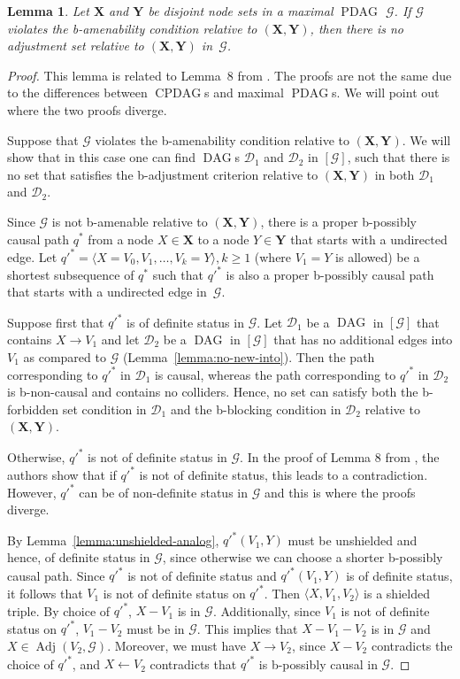 \documentclass[letterpaper]{article}
\newtheorem{lemma}[theorem]{Lemma}
\theoremstyle{definition}
\theoremstyle{remark}
\DeclareMathOperator{\PDAG}{PDAG}
\DeclareMathOperator{\CPDAG}{CPDAG}
\DeclareMathOperator{\DAG}{DAG}
\DeclareMathOperator{\Adj}{Adj}
\newcommand{\bamen}{the b-amenability condition}
\newcommand{\bforb}{the b-forbidden set condition}
\newcommand{\bblck}{the b-blocking condition}
\newcommand{\mpdag}{maximal $\PDAG$}
\newcommand{\g}[1][G]{\mathcal{#1}}
\newcommand{\pstar}[1][p]{{#1}^{*}}
\begin{document}
\begin{lemma}
Let $\mathbf{X}$ and $\mathbf{Y}$ be disjoint node sets in a \mpdag{} $\g$. If $\g$ violates \bamen{} relative to $(\mathbf{X},\mathbf{Y})$, then there is no adjustment set relative to $(\mathbf{X},\mathbf{Y})$ in~$\g$. 
\label{lemma:amen-pdag}
\end{lemma}

\begin{proof} 
This lemma is related to Lemma~8 from \cite{perkovic16}. The proofs are not the same due to the differences between $\CPDAG$s and \mpdag{}s. We will point out where the two proofs diverge.

   Suppose that $\g$ violates \bamen{} relative to $(\mathbf{X},\mathbf{Y})$. We will show that in this case one can find $\DAG$s $\g[D]_1$ and $\g[D]_2$ in $[\g]$, such that there is no set that satisfies the b-adjustment criterion relative to $(\mathbf{X,Y})$ in both $\g[D]_1$ and $\g[D]_2$.
 
 Since $\g$ is not b-amenable relative to $(\mathbf{X,Y})$, there is a proper b-possibly causal path $\pstar[q]$ from a node $X \in \mathbf{X}$ to a node $Y \in \mathbf{Y}$ that starts with a undirected edge.
   Let $\pstar[q'] = \langle X= V_0,V_1,\dots,V_k=Y\rangle, k \ge 1$ (where $V_1 = Y$ is allowed) be a shortest subsequence of $\pstar[q]$ such that $\pstar[q']$ is also a proper b-possibly causal path that starts with a undirected edge in~$\g$. 
  
   Suppose first that $\pstar[q']$ is of definite status in $\g$. Let $\g[D]_1$ be a $\DAG$ in $[\g]$ that contains $X \rightarrow V_1$  and let $\g[D]_2$ be a $\DAG$ in $[\g]$ that has no additional edges into $V_1$ as compared to $\g$ (Lemma~\ref{lemma:no-new-into}). Then the path corresponding to $\pstar[q']$ in $\g[D]_1$ is causal, whereas the path corresponding to $\pstar[q']$ in $\g[D]_2$ is b-non-causal and contains no colliders. Hence, no set can satisfy both \bforb{} in $\g[D]_1$ and \bblck{} in $\g[D]_2$  relative to $(\mathbf{X,Y})$.
   
Otherwise, $\pstar[q']$ is not of definite status in $\g$. In the proof of Lemma 8 from \cite{perkovic16}, the authors show that if $\pstar[q']$ is not of definite status, this leads to a contradiction. However, $\pstar[q']$  can be of non-definite status in $\g$ and this is where the proofs diverge. 

By Lemma~\ref{lemma:unshielded-analog}, $\pstar[q'](V_1,Y)$ must be unshielded and hence, of definite status in $\g$, since otherwise we can choose a shorter b-possibly causal path.
Since $\pstar[q']$ is not of definite status and $\pstar[q'](V_1,Y)$ is of definite status, it follows that $V_1$ is not of definite status on $\pstar[q']$. Then $\langle X, V_1, V_2 \rangle$ is a shielded triple. By choice of $\pstar[q']$, $X - V_1$ is in $\g$. Additionally, since $V_1$ is not of definite status on $\pstar[q']$, $V_1 - V_2$ must be in $\g$.
This implies that $X - V_1 -V_2$ is in $\g$ and $X \in \Adj(V_2,\g)$. Moreover, we must have $X \to V_2$, since $X - V_2$ contradicts the choice of $\pstar[q']$, and $X \leftarrow V_2$ contradicts that $\pstar[q']$ is b-possibly causal in $\g$. 


\end{proof}
\end{document}
